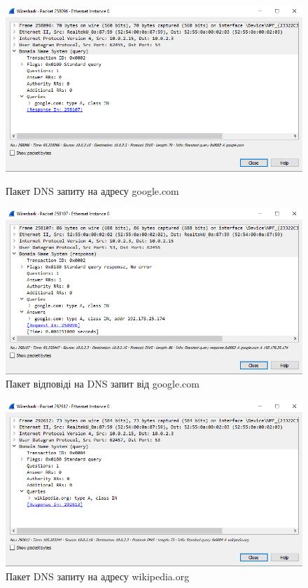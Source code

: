 \documentclass{article}
\begin{document}
\begin{normalsize}
 \begin{figure}[H]
 	\centering
 	\begin{minipage}[t]{0.49\textwidth}
 		\includegraphics[width=\textwidth]{11}
	 	\caption{Пакет DNS запиту на адресу google.com}
 	\end{minipage}
 	\hfill
	 \begin{minipage}[t]{0.49\textwidth}
	 	\includegraphics[width=\textwidth]{12}
		\caption{Пакет відповіді на DNS запит від google.com}
	 \end{minipage}
 \end{figure}

\begin{figure}[H]
	\centering
	\includegraphics[width=\textwidth]{21}
	\caption{Пакет DNS запиту на адресу wikipedia.org}
\end{figure}


\end{normalsize}
\end{document}
